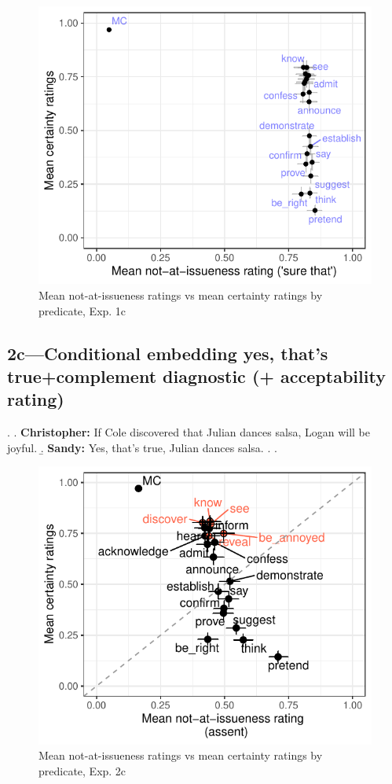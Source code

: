 \documentclass[11pt]{article}
\begin{document}
		\begin{figure}[h]
			\centering
			\includegraphics[scale=0.85]{figures/c1-correl.pdf}
			\caption{Mean not-at-issueness ratings vs mean certainty ratings by predicate, Exp. 1c}
			\label{fig:m1-corr}
		\end{figure}


	\subsection{2c---Conditional embedding yes, that's true+complement diagnostic (+ acceptability rating)} %
		\ex. \a. \textbf{Christopher:} If Cole discovered that Julian dances salsa, Logan will be joyful.
			\b. \textbf{Sandy:} Yes, that’s true, Julian dances salsa.
			\z.
		\z.

		\begin{figure}[h]
			\centering
			\includegraphics[scale=0.85]{figures/c2-correl.pdf}
			\caption{Mean not-at-issueness ratings vs mean certainty ratings by predicate, Exp. 2c}
			\label{fig:m1-corr}
		\end{figure}
\end{document}
